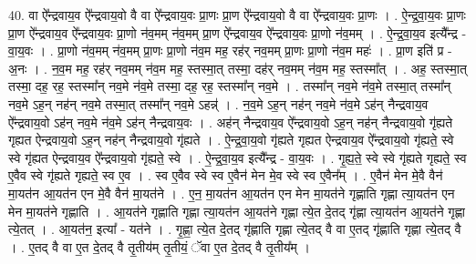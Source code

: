\documentclass[17pt]{extarticle}
\begin{document}
40. वा ऐ᳚न्द्रवाय॒व ऐ᳚न्द्रवाय॒वो वै वा ऐ᳚न्द्रवाय॒वः प्रा॒णः प्रा॒ण ऐ᳚न्द्रवाय॒वो वै वा ऐ᳚न्द्रवाय॒वः प्रा॒णः । . ऐ॒न्द्र॒वा॒य॒वः प्रा॒णः प्रा॒ण ऐ᳚न्द्रवाय॒व ऐ᳚न्द्रवाय॒वः प्रा॒णो न॑व॒मम् न॑व॒मम् प्रा॒ण ऐ᳚न्द्रवाय॒व ऐ᳚न्द्रवाय॒वः प्रा॒णो न॑व॒मम् । . ऐ॒न्द्र॒वा॒य॒व इत्यै᳚न्द्र - वा॒य॒वः । . प्रा॒णो न॑व॒मम् न॑व॒मम् प्रा॒णः प्रा॒णो न॑व॒म मह॒ रह॑र् नव॒मम् प्रा॒णः प्रा॒णो न॑व॒म महः॑ । . प्रा॒ण इति॑ प्र - अ॒नः । . न॒व॒म मह॒ रह॑र् नव॒मम् न॑व॒म मह॒ स्तस्मा॒त् तस्मा॒ दह॑र् नव॒मम् न॑व॒म मह॒ स्तस्मा᳚त् । . अह॒ स्तस्मा॒त् तस्मा॒ दह॒ रह॒ स्तस्मा᳚न् नव॒मे न॑व॒मे तस्मा॒ दह॒ रह॒ स्तस्मा᳚न् नव॒मे । . तस्मा᳚न् नव॒मे न॑व॒मे तस्मा॒त् तस्मा᳚न् नव॒मे ऽह॒न् नह॑न् नव॒मे तस्मा॒त् तस्मा᳚न् नव॒मे ऽहन्न्॑ । . न॒व॒मे ऽह॒न् नह॑न् नव॒मे न॑व॒मे ऽह॑न् नैन्द्रवाय॒व ऐ᳚न्द्रवाय॒वो ऽह॑न् नव॒मे न॑व॒मे ऽह॑न् नैन्द्रवाय॒वः । . अह॑न् नैन्द्रवाय॒व ऐ᳚न्द्रवाय॒वो ऽह॒न् नह॑न् नैन्द्रवाय॒वो गृ॑ह्यते गृह्यत ऐन्द्रवाय॒वो ऽह॒न् नह॑न् नैन्द्रवाय॒वो गृ॑ह्यते । . ऐ॒न्द्र॒वा॒य॒वो गृ॑ह्यते गृह्यत ऐन्द्रवाय॒व ऐ᳚न्द्रवाय॒वो गृ॑ह्यते॒ स्वे स्वे गृ॑ह्यत ऐन्द्रवाय॒व ऐ᳚न्द्रवाय॒वो गृ॑ह्यते॒ स्वे । . ऐ॒न्द्र॒वा॒य॒व इत्यै᳚न्द्र - वा॒य॒वः । . गृ॒ह्य॒ते॒ स्वे स्वे गृ॑ह्यते गृह्यते॒ स्व ए॒वैव स्वे गृ॑ह्यते गृह्यते॒ स्व ए॒व । . स्व ए॒वैव स्वे स्व ए॒वैन॑ मेन मे॒व स्वे स्व ए॒वैन᳚म् । . ए॒वैन॑ मेन मे॒वै वैन॑ मा॒यत॑न आ॒यत॑न एन मे॒वै वैन॑ मा॒यत॑ने । . ए॒न॒ मा॒यत॑न आ॒यत॑न एन मेन मा॒यत॑ने गृह्णाति गृह्णा त्या॒यत॑न एन मेन मा॒यत॑ने गृह्णाति । . आ॒यत॑ने गृह्णाति गृह्णा त्या॒यत॑न आ॒यत॑ने गृह्णा त्ये॒त दे॒तद् गृ॑ह्णा त्या॒यत॑न आ॒यत॑ने गृह्णा त्ये॒तत् । . आ॒यत॑न॒ इत्या᳚ - यत॑ने । . गृ॒ह्णा॒ त्ये॒त दे॒तद् गृ॑ह्णाति गृह्णा त्ये॒तद् वै वा ए॒तद् गृ॑ह्णाति गृह्णा त्ये॒तद् वै । . ए॒तद् वै वा ए॒त दे॒तद् वै तृ॒तीय॑म् तृ॒तीयं॒ ॅवा ए॒त दे॒तद् वै तृ॒तीय᳚म् । \newline
\pagebreak
{}
\end{document}
